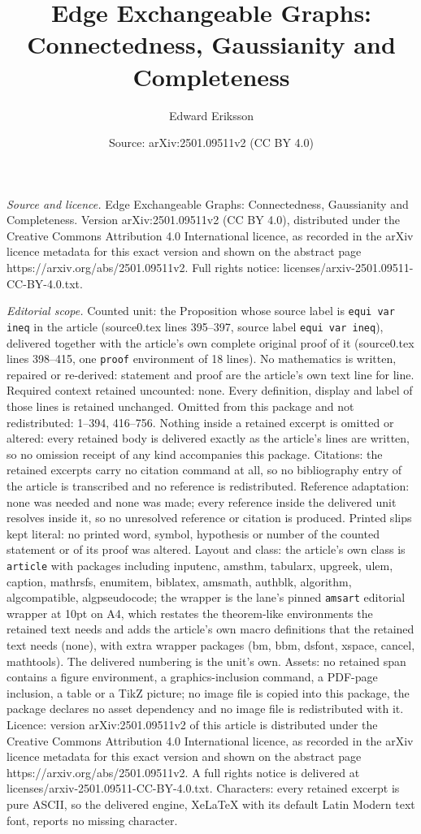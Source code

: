 \documentclass[10pt,a4paper]{amsart}
\title[Edge Exchangeable Graphs: Connectedness, Gaussianity and Com]{Edge Exchangeable Graphs: Connectedness, Gaussianity and Completeness}
\author{Edward Eriksson}
\date{Source: arXiv:2501.09511v2 (CC BY 4.0)}
\begin{document}
\maketitle

\noindent\emph{Source and licence.} Edge Exchangeable Graphs: Connectedness, Gaussianity and Completeness. Version arXiv:2501.09511v2 (CC BY 4.0), distributed under the Creative Commons Attribution 4.0 International licence, as recorded in the arXiv licence metadata for this exact version and shown on the abstract page https://arxiv.org/abs/2501.09511v2. Full rights notice: licenses/arxiv-2501.09511-CC-BY-4.0.txt.\par\smallskip

\noindent\textit{Editorial scope.} Counted unit: the Proposition whose source label is \texttt{equi var ineq} in the article (source0.tex lines 395--397, source label \texttt{equi var ineq}), delivered together with the article's own complete original proof of it (source0.tex lines 398--415, one \texttt{proof} environment of 18 lines). No mathematics is written, repaired or re-derived: statement and proof are the article's own text line for line. Required context retained uncounted: none. Every definition, display and label of those lines is retained unchanged. Omitted from this package and not redistributed: 1--394, 416--756. Nothing inside a retained excerpt is omitted or altered: every retained body is delivered exactly as the article's lines are written, so no omission receipt of any kind accompanies this package. Citations: the retained excerpts carry no citation command at all, so no bibliography entry of the article is transcribed and no reference is redistributed. Reference adaptation: none was needed and none was made; every reference inside the delivered unit resolves inside it, so no unresolved reference or citation is produced. Printed slips kept literal: no printed word, symbol, hypothesis or number of the counted statement or of its proof was altered. Layout and class: the article's own class is \texttt{article} with packages including inputenc, amsthm, tabularx, upgreek, ulem, caption, mathrsfs, enumitem, biblatex, amsmath, authblk, algorithm, algcompatible, algpseudocode; the wrapper is the lane's pinned \texttt{amsart} editorial wrapper at 10pt on A4, which restates the theorem-like environments the retained text needs and adds the article's own macro definitions that the retained text needs (none), with extra wrapper packages (bm, bbm, dsfont, xspace, cancel, mathtools). The delivered numbering is the unit's own. Assets: no retained span contains a figure environment, a graphics-inclusion command, a PDF-page inclusion, a table or a TikZ picture; no image file is copied into this package, the package declares no asset dependency and no image file is redistributed with it. Licence: version arXiv:2501.09511v2 of this article is distributed under the Creative Commons Attribution 4.0 International licence, as recorded in the arXiv licence metadata for this exact version and shown on the abstract page https://arxiv.org/abs/2501.09511v2. A full rights notice is delivered at licenses/arxiv-2501.09511-CC-BY-4.0.txt. Characters: every retained excerpt is pure ASCII, so the delivered engine, XeLaTeX with its default Latin Modern text font, reports no missing character.
\end{document}
